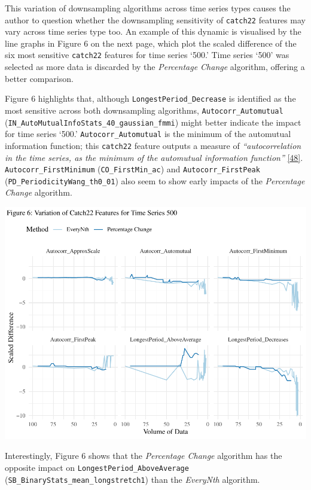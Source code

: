 \documentclass{article}
\begin{document}
This variation of downsampling algorithms across time series types
causes the author to question whether the downsampling sensitivity of
\texttt{catch22} features may vary across time series type too. An
example of this dynamic is visualised by the line graphs in Figure 6 on
the next page, which plot the scaled difference of the six most
sensitive \texttt{catch22} features for time series `500.' Time series
`500' was selected as more data is discarded by the \emph{Percentage
Change} algorithm, offering a better comparison.

Figure 6 highlights that, although \texttt{LongestPeriod\_Decrease} is
identified as the most sensitive across both downsampling algorithms,
\texttt{Autocorr\_Automutual}
(\texttt{IN\_AutoMutualInfoStats\_40\_gaussian\_fmmi}) might better
indicate the impact for time series `500.' \texttt{Autocorr\_Automutual}
is the minimum of the automutual information function; this
\texttt{catch22} feature outputs a measure of \emph{``autocorrelation in
the time series, as the minimum of the automutual information
function''} \protect\hyperlink{ref-feature_book}{{[}48{]}}.
\texttt{Autocorr\_FirstMinimum} (\texttt{CO\_FirstMin\_ac}) and
\texttt{Autocorr\_FirstPeak} (\texttt{PD\_PeriodicityWang\_th0\_01})
also seem to show early impacts of the \emph{Percentage Change}
algorithm.

\includegraphics{210431461_CSC8639_Dissertation_files/figure-latex/Catch22Variation-1.pdf}

Interestingly, Figure 6 shows that the \emph{Percentage Change}
algorithm has the opposite impact on
\texttt{LongestPeriod\_AboveAverage}
(\texttt{SB\_BinaryStats\_mean\_longstretch1}) than the \emph{EveryNth}
algorithm.
\end{document}
